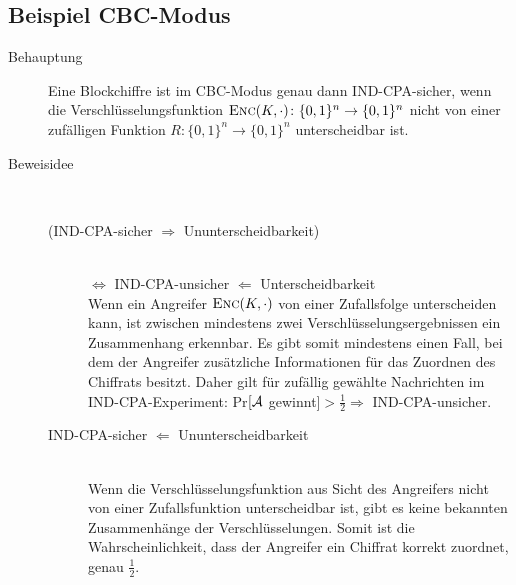 \subsection{Beispiel CBC-Modus}
%
\begin{description} 
	\item[Behauptung] Eine Blockchiffre ist im CBC-Modus genau dann IND-CPA-sicher, wenn die Verschlüsselungsfunktion $\textsc{Enc}(K,\cdot) \colon \{0,1\}^n \rightarrow \{0,1\}^n$ nicht von einer zufälligen Funktion $R \colon \{0,1\}^n \rightarrow \{0,1\}^n$ unterscheidbar ist.
	\item[Beweisidee]~
	\begin{description}
		\item[(IND-CPA-sicher $\Rightarrow$ Ununterscheidbarkeit)]~\\
		$\Leftrightarrow$ IND-CPA-unsicher $\Leftarrow$ Unterscheidbarkeit~\\
		Wenn ein Angreifer $\textsc{Enc}(K, \cdot)$ von einer Zufallsfolge unterscheiden kann, ist zwischen mindestens zwei Verschlüsselungsergebnissen ein Zusammenhang erkennbar. Es gibt somit mindestens einen Fall, bei dem der Angreifer zusätzliche Informationen für das Zuordnen des Chiffrats besitzt. Daher gilt für zufällig gewählte Nachrichten im IND-CPA-Experiment: Pr$[\mathcal{A}$ gewinnt$] > \frac{1}{2} \Rightarrow$ IND-CPA-unsicher.
		\item[IND-CPA-sicher $\Leftarrow$ Ununterscheidbarkeit]~\\
		Wenn die Verschlüsselungsfunktion aus Sicht des Angreifers nicht von einer Zufallsfunktion unterscheidbar ist, gibt es keine bekannten Zusammenhänge der Verschlüsselungen. Somit ist die Wahrscheinlichkeit, dass der Angreifer ein Chiffrat korrekt zuordnet, genau $\frac{1}{2}$.
	\end{description}
\end{description}


